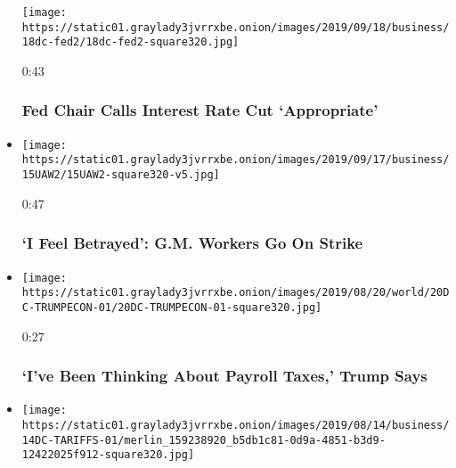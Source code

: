 \begin{itemize}
  \texttt{[image: https://static01.graylady3jvrrxbe.onion/images/2019/09/18/business/18dc-fed2/18dc-fed2-square320.jpg]}

  0:43

  \hypertarget{fed-chair-calls-interest-rate-cut-appropriate}{%
  \subsubsection{Fed Chair Calls Interest Rate Cut
  `Appropriate'}\label{fed-chair-calls-interest-rate-cut-appropriate}}
\item
  \href{https://www.nytimes3xbfgragh.onion/video/us/100000006719637/gm-strike.html?action=click\&module=video-series-bar\&region=header\&pgtype=Article\&playlistId=video/business}{}

  \texttt{[image: https://static01.graylady3jvrrxbe.onion/images/2019/09/17/business/15UAW2/15UAW2-square320-v5.jpg]}

  0:47

  \hypertarget{i-feel-betrayed-gm-workers-go-on-strike}{%
  \subsubsection{`I Feel Betrayed': G.M. Workers Go On
  Strike}\label{i-feel-betrayed-gm-workers-go-on-strike}}
\item
  \href{https://www.nytimes3xbfgragh.onion/video/us/politics/100000006672074/trump-payroll-tax-cut.html?action=click\&module=video-series-bar\&region=header\&pgtype=Article\&playlistId=video/business}{}

  \texttt{[image: https://static01.graylady3jvrrxbe.onion/images/2019/08/20/world/20DC-TRUMPECON-01/20DC-TRUMPECON-01-square320.jpg]}

  0:27

  \hypertarget{ive-been-thinking-about-payroll-taxes-trump-says}{%
  \subsubsection{`I've Been Thinking About Payroll Taxes,' Trump
  Says}\label{ive-been-thinking-about-payroll-taxes-trump-says}}
\item
  \href{https://www.nytimes3xbfgragh.onion/video/us/politics/100000006661985/trump-china-tariffs.html?action=click\&module=video-series-bar\&region=header\&pgtype=Article\&playlistId=video/business}{}

  \texttt{[image: https://static01.graylady3jvrrxbe.onion/images/2019/08/14/business/14DC-TARIFFS-01/merlin\_159238920\_b5db1c81-0d9a-4851-b3d9-12422025f912-square320.jpg]}


\end{itemize}
